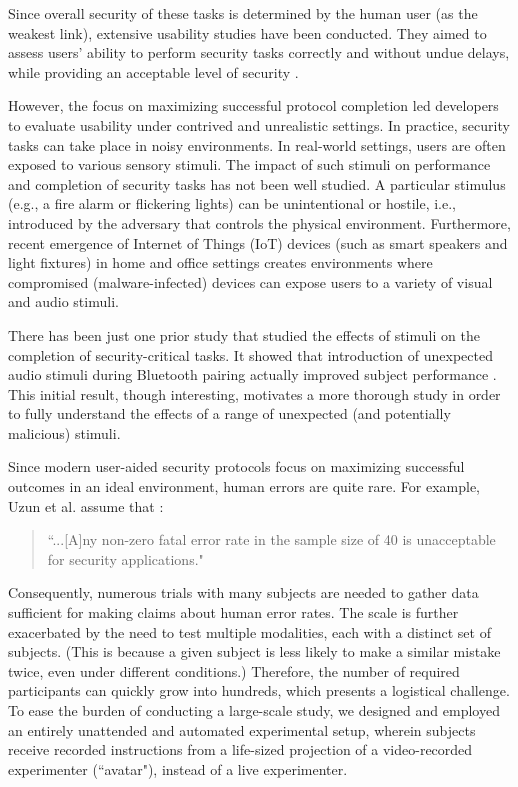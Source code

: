 \documentclass{llncs}
\begin{document}
Since overall security of these tasks is determined by the human user (as the weakest link), 
extensive usability studies have been conducted. They aimed to assess users' ability to 
perform security tasks correctly and without undue delays, while providing an acceptable 
level of security \cite{kobsa_serial_2009} \cite{goodrich_using_2009} \cite{nithyanand_groupthink:_2010} 
\cite{kainda_usability_2009}. 

However, the focus on maximizing successful protocol completion led developers to evaluate usability 
under contrived and unrealistic settings. In practice, security tasks can take place in noisy environments. 
In real-world settings, users are often exposed to various sensory stimuli. The impact of such stimuli on 
performance and completion of security tasks has not been well studied. A particular stimulus (e.g., a fire alarm 
or flickering lights) can be unintentional or hostile, i.e., introduced by the adversary that controls the physical 
environment. Furthermore, recent emergence of Internet of Things (IoT) devices (such as smart speakers and 
light fixtures) in home and office settings creates environments where compromised (malware-infected) 
devices can expose users to a variety of visual and audio stimuli. 

There has been just one prior study that studied the effects of stimuli on the completion of security-critical tasks. 
It showed that introduction of unexpected audio stimuli during Bluetooth pairing actually improved subject performance \cite{kaczmarek_unattended_2015}. This initial result, though interesting, motivates a more thorough study 
in order to fully understand the effects of a range of unexpected (and potentially malicious) stimuli.

Since modern user-aided security protocols focus on maximizing successful outcomes
in an ideal environment, human errors are quite rare. For example, Uzun et al. \cite{Uzun_2007} assume that :
\begin{quote}
``...[A]ny non-zero fatal error rate in the sample size of 40
is unacceptable for security applications."
\end{quote} 
Consequently, numerous trials with many subjects are needed to
gather data sufficient for making claims about human error rates. The scale is further 
exacerbated by the need to test  multiple modalities, each with a distinct set of subjects. (This is because a 
given subject is less likely to make a similar mistake twice, even under different conditions.) Therefore, 
the number of required participants can quickly grow into hundreds, which presents a logistical 
challenge. To ease the burden of conducting a large-scale study, we designed and employed an 
entirely unattended and automated experimental setup, wherein subjects receive recorded
instructions from a life-sized projection of a video-recorded experimenter (``avatar"), 
instead of a live experimenter.
 
\end{document}

